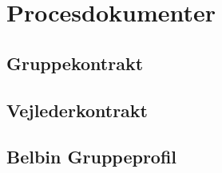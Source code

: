 \section{Procesdokumenter}

\subsection{Gruppekontrakt}


\newpage
\subsection{Vejlederkontrakt}


\newpage
\subsection{Belbin Gruppeprofil}
